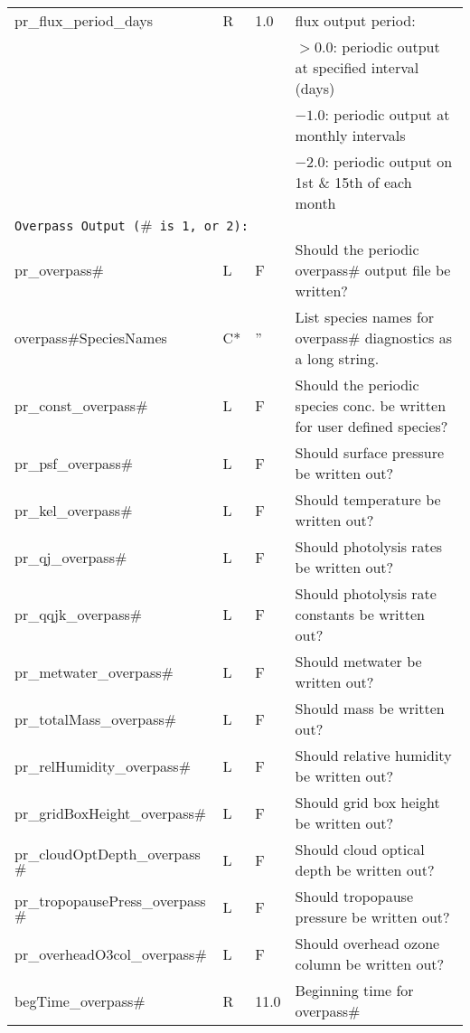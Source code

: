 {\begin{landscape}
\begin{center}
\begin{longtable}{|l|l|l|l|}
pr\_flux\_period\_days      & R &  1.0 & flux output period:  \\
                          &   &      & $>0.0$:  periodic output at specified interval (days)  \\
                          &   &      & $-1.0$:  periodic output at monthly intervals  \\
                          &   &      & $-2.0$:  periodic output on 1st \& 15th of each month  \\ \hline
\multicolumn{4}{|l|}{\tt Overpass Output ($\#$ is 1, or 2):} \\ \hline
  pr\_overpass$\#$   & L & F & Should the periodic overpass$\#$ output file be written?  \\ \hline
  overpass$\#$SpeciesNames  & C* & ''  & List species names for overpass$\#$ diagnostics as a long string. \\ \hline
  pr\_const\_overpass$\#$   & L & F & Should the periodic species conc. be written for user defined species?  \\ \hline
  pr\_psf\_overpass$\#$   & L & F & Should surface pressure be written out?  \\ \hline
  pr\_kel\_overpass$\#$   & L & F & Should temperature be written out?  \\ \hline
  pr\_qj\_overpass$\#$   & L & F & Should photolysis rates be written out?  \\ \hline
  pr\_qqjk\_overpass$\#$   & L & F & Should photolysis rate constants be written out?  \\ \hline
  pr\_metwater\_overpass$\#$   & L & F & Should metwater be written out?  \\ \hline
  pr\_totalMass\_overpass$\#$   & L & F & Should mass be written out?  \\ \hline
  pr\_relHumidity\_overpass$\#$   & L & F & Should relative humidity be written out?  \\ \hline
  pr\_gridBoxHeight\_overpass$\#$   & L & F & Should grid box height be written out?  \\ \hline
  pr\_cloudOptDepth\_overpass$\#$   & L & F & Should cloud optical depth be written out?  \\ \hline
  pr\_tropopausePress\_overpass$\#$  & L & F & Should tropopause pressure be written out?  \\ \hline
  pr\_overheadO3col\_overpass$\#$   & L & F & Should overhead ozone column be written out?  \\ \hline
  begTime\_overpass$\#$ & R & 11.0 & Beginning time for overpass$\#$ \\ \hline

\end{longtable}
\end{center}
\end{landscape}}
